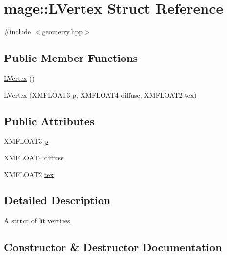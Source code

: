 \hypertarget{structmage_1_1_l_vertex}{}\section{mage\+:\+:L\+Vertex Struct Reference}
\label{structmage_1_1_l_vertex}


{\ttfamily \#include $<$geometry.\+hpp$>$}

\subsection*{Public Member Functions}
\begin{DoxyCompactItemize}
\item 
\hyperlink{structmage_1_1_l_vertex_abfc69fb38d5f37b07d1c420a23a3e7f9}{L\+Vertex} ()
\item 
\hyperlink{structmage_1_1_l_vertex_a943f361fc84d2223dd317a4b20622f40}{L\+Vertex} (X\+M\+F\+L\+O\+A\+T3 \hyperlink{structmage_1_1_l_vertex_afdf01d172b1992d4e4f37b9ad9fb2d27}{p}, X\+M\+F\+L\+O\+A\+T4 \hyperlink{structmage_1_1_l_vertex_abfe65c089e650ad20ed41de8e2b585dd}{diffuse}, X\+M\+F\+L\+O\+A\+T2 \hyperlink{structmage_1_1_l_vertex_abeca49c231f9b85063dbd4c0522d7edc}{tex})
\end{DoxyCompactItemize}
\subsection*{Public Attributes}
\begin{DoxyCompactItemize}
\item 
X\+M\+F\+L\+O\+A\+T3 \hyperlink{structmage_1_1_l_vertex_afdf01d172b1992d4e4f37b9ad9fb2d27}{p}
\item 
X\+M\+F\+L\+O\+A\+T4 \hyperlink{structmage_1_1_l_vertex_abfe65c089e650ad20ed41de8e2b585dd}{diffuse}
\item 
X\+M\+F\+L\+O\+A\+T2 \hyperlink{structmage_1_1_l_vertex_abeca49c231f9b85063dbd4c0522d7edc}{tex}
\end{DoxyCompactItemize}


\subsection{Detailed Description}
A struct of lit vertices. 

\subsection{Constructor \& Destructor Documentation}
\hypertarget{structmage_1_1_l_vertex_abfc69fb38d5f37b07d1c420a23a3e7f9}{}\label{structmage_1_1_l_vertex_abfc69fb38d5f37b07d1c420a23a3e7f9} 
